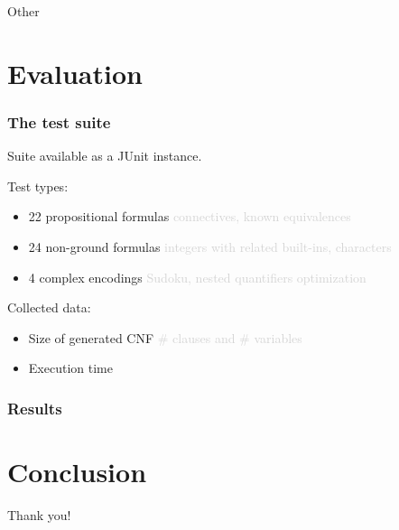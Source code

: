 \documentclass[smaller,dvipsnames]{beamer}
\begin{document}
  \begin{frame}{Other}
  \end{frame}

  \section{Evaluation}

  \begin{frame}
    \frametitle{The test suite}
    Suite available as a \alert{JUnit} instance.

    Test types:
    \begin{itemize}
      \item 22 propositional formulas \textcolor{lightgray}{connectives, known equivalences}
      \item 24 non-ground formulas \textcolor{lightgray}{integers with related built-ins, characters}
      \item 4 complex encodings \textcolor{lightgray}{Sudoku, nested quantifiers optimization}
    \end{itemize}
    Collected data:
    \begin{itemize}
      \item \alert{Size} of generated CNF \textcolor{lightgray}{\# clauses and \# variables}
      \item Execution \alert{time}
    \end{itemize}
  \end{frame}

  \begin{frame}
    \frametitle{Results}
  \end{frame}

  \section{Conclusion}


  \begin{frame}[standout]
    Thank you!
  \end{frame}
\end{document}
